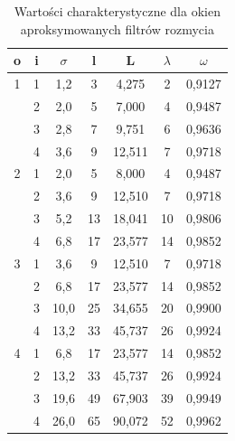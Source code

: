 \begin{table}
\centering

\begin{tabular}{|c|c|c|c|c|c|c|}
  \hline 
   o & i & $\sigma$ & l & L & $\lambda$ & $\omega$ \\ 
  \hline 
   1 & 1 & 1,2 & 3 & 4,275 & 2 & 0,9127 \\ 
  \hline 
     & 2 & 2,0 & 5 & 7,000 & 4 & 0,9487 \\ 
  \hline 
     & 3 & 2,8 & 7 & 9,751 & 6 & 0,9636 \\ 
  \hline 
     & 4 & 3,6 & 9 & 12,511 & 7 & 0,9718 \\ 
  \hline 
   2 & 1 & 2,0 &5 & 8,000 & 4 & 0,9487 \\ 
  \hline 
     & 2 & 3,6 & 9 & 12,510 & 7 & 0,9718 \\ 
  \hline 
     & 3 & 5,2 & 13 & 18,041 & 10 & 0,9806 \\ 
  \hline 
     & 4 & 6,8 &17 & 23,577 & 14 & 0,9852 \\ 
  \hline 
   3 & 1 & 3,6 & 9 & 12,510 & 7 & 0,9718 \\ 
  \hline 
     & 2 & 6,8 & 17 & 23,577 & 14 & 0,9852 \\ 
  \hline 
     & 3 & 10,0 & 25 & 34,655 & 20 & 0,9900 \\ 
  \hline 
    & 4 &13,2 & 33 & 45,737 & 26 & 0,9924 \\ 
  \hline 
   4 & 1& 6,8 & 17 & 23,577 & 14 & 0,9852 \\ 
  \hline 
    & 2 &13,2 & 33 & 45,737 & 26 & 0,9924 \\ 
  \hline 
    & 3 &19,6 & 49 & 67,903 & 39 & 0,9949 \\ 
  \hline 
    & 4 &26,0 & 65 & 90,072 & 52 & 0,9962 \\ 
  \hline 
  \end{tabular}
  \caption{Wartości charakterystyczne dla okien aproksymowanych filtrów rozmycia}
  \label{tab:surf_parameters}
\end{table}

